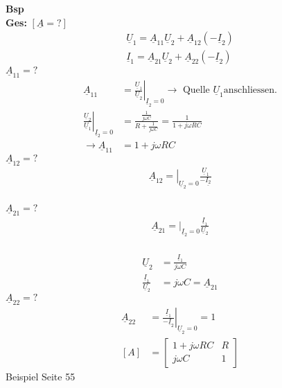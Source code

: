 \textbf{Bsp}
\\
\textbf{Ges:} $[\underline{A}=?]$\\
\begin{align}
	\underline{U}_1=\underline{A}_{11}\underline{U}_2+\underline{A}_{12}\left(-\underline{I}_2\right)\nonumber\\
	\underline{I}_1=\underline{A}_{21}\underline{U}_2+\underline{A}_{22}\left(-\underline{I}_2\right)\nonumber
\end{align}
$\underline{A}_{11}=?$\\
\begin{align}
	\underline{A}_{11}&=\left.\frac{\underline{U}_1}{\underline{U}_2}\right|_{\underline{I}_2=0}
	\rightarrow\text{ Quelle } \underline{U}_1 \text{anschliessen.}\nonumber\\
	\left.\frac{\underline{U}_2}{\underline{U}_1}\right|_{\underline{I}_2=0}&=\frac{\frac{1}{j\omega
	C}}{R+\frac{1}{j\omega C}}=\frac{1}{1+j\omega RC}\nonumber\\
	\rightarrow \underline{A}_{11}&=1+j\omega RC\nonumber
\end{align}
$\underline{A}_{12}=?$\\
\begin{align}
	\left.\underline{A}_{12}=\right|_{\underline{U}_2=0}\frac{\underline{U}_1}{-\underline{{I}_2}}\nonumber
\end{align}
\\
$\underline{A}_{21}=?$\\
\begin{align}
	\underline{A}_{21}\left.=\right|_{\underline{I}_2=0}\frac{\underline{I}_1}{\underline{U}_2}\nonumber
\end{align}
\\
\begin{align}
	\underline{U}_2&=\frac{\underline{I}_1}{j\omega C}\nonumber\\
	\frac{\underline{I}_1}{\underline{U}_2}&=j\omega C =
	\underline{A}_{21}\nonumber
\end{align}
$\underline{A}_{22}=?$\\
\begin{align}
	\underline{A}_{22}&=\left.\frac{\underline{I}_1}{-\underline{I}_2}\right|_{\underline{U}_2=0}=1\nonumber\\
	[A]&=
	\begin{bmatrix}
		1+j\omega RC & R\\
		j\omega C & 1
	\end{bmatrix}\nonumber
\end{align}
Beispiel Seite 55\\
